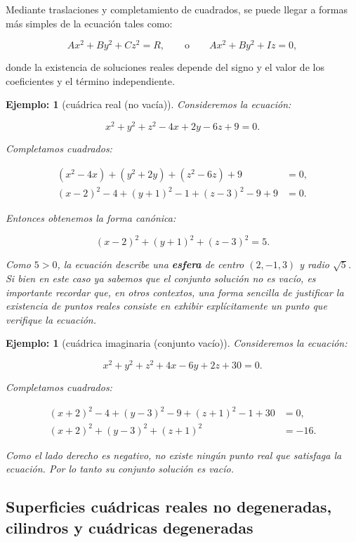\documentclass[11pt]{article}
\newtheorem{ejem}[teo]{{\bf Ejemplo}:}
\begin{document}
Mediante traslaciones y completamiento de cuadrados, se puede llegar a formas más simples de la ecuación tales como:

\[
Ax^2 + By^2 + Cz^2 = R, 
\qquad\text{o}\qquad 
Ax^2 + By^2 + Iz = 0,
\]

donde la existencia de soluciones reales depende del signo y el valor de los coeficientes y el término independiente.




\begin{ejem}[cuádrica real (no vacía)]
Consideremos la ecuación:

\[
x^2 + y^2 + z^2 - 4x + 2y - 6z + 9 = 0.
\]

Completamos cuadrados:

\begin{align*}
(x^2 - 4x) + (y^2 + 2y) + (z^2 - 6z) + 9 &= 0,\\
(x-2)^2 - 4 + (y+1)^2 - 1 + (z-3)^2 - 9 + 9 &= 0.
\end{align*}

Entonces obtenemos la forma canónica:

\[
(x-2)^2 + (y+1)^2 + (z-3)^2 = 5.
\]

Como $5 > 0$, la ecuación describe una \textbf{esfera} de centro $(2,-1,3)$ y radio $\sqrt{5}$. Si bien en este caso ya sabemos que el conjunto solución no es vacío, es importante recordar que, en otros contextos, una forma sencilla de justificar la existencia de puntos reales consiste en exhibir explícitamente un punto que verifique la ecuación.
\end{ejem}


\begin{ejem}[cuádrica imaginaria (conjunto vacío)]
Consideremos la ecuación:

\[
x^2 + y^2 + z^2 + 4x - 6y + 2z + 30 = 0.
\]

Completamos cuadrados:

\begin{align*}
(x+2)^2 - 4 + (y-3)^2 - 9 + (z+1)^2 - 1 + 30 &= 0,\\
(x+2)^2 + (y-3)^2 + (z+1)^2 &= -16.
\end{align*}

Como el lado derecho es negativo, no existe ningún punto real que satisfaga la ecuación. Por lo tanto su conjunto solución es vacío.
\end{ejem}



\subsection*{Superficies cuádricas reales no degeneradas, cilindros y cuádricas degeneradas}
\end{document}
